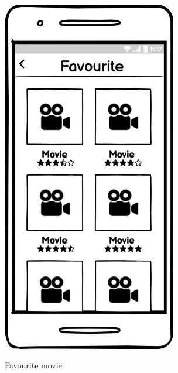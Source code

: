 \documentclass[12pt, a4paper]{article}
\numberwithin{figure}{section}
\begin{document}
\begin{center}
\begin{minipage}{0.31\textwidth}
\begin{figure}[H]
			\includegraphics[width=0.68\textwidth]{images/mockups/Favourite.png}\\
			\caption{Favourite movie}
		\end{figure}
	\end{minipage}	
\end{center}
\mbox{}\\
\end{document}
